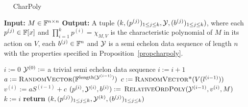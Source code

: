 \begin{algorithm}
\caption{$\quad$ \sc CharPoly}
\label{algcharpoly}
%
\begin{algorithmic}
\STATE \textbf{Input:} $M \in \mathbb{F}^{n\times n}$
\STATE \textbf{Output:} 
A tuple $(k, (p^{(j)})_{1\leq j\leq k}, \mathcal{Y}, (b^{(j)})_{1\leq j\leq
k})$, where  each $p^{(j)}\in\mathbb{F}[x]$ and $\prod_{i=1}^k p^{(i)} =
\chi_{M,V}$ is the characteristic polynomial
of $M$ in its action on $V$,  each  $b^{(j)}\in\mathbb{F}^n$ and $\mathcal{Y}$ is a
semi echelon data sequence of length $n$ with the properties
specified in Proposition~\ref{propcharpoly}.

\vspace*{2mm}
\STATE $i := 0$
\STATE $\mathcal{Y}^{(0)}:=$ a trivial semi echelon data sequence
    \STATE $i := i + 1$
    \STATE $a := \mbox{\sc RandomVector}(\mathbb{F}^{\mathrm{length}(\mathcal{Y}^{(i-1)})})$
    \STATE $c := \mbox{\sc RandomVector*}(V(l^{(i-1)}))$
    \STATE $v^{(i)} := aS^{(i-1)} + c$
	\STATE 
       \hspace*{10mm} 
    \STATE $(p^{(i)},\mathcal{Y}^{(i)},b^{(i)}) :=$
             $\mbox{\sc RelativeOrdPoly}(\mathcal{Y}^{(i-1)},v^{(i)},M)$
\STATE  \hspace*{10mm} 
\ENDWHILE
\STATE $k := i$
\STATE \textbf{return} $(k,(p^{(j)})_{1 \le j \le k}, 
                       \mathcal{Y}^{(k)}, 
(b^{(j)})_{1 \le j \le k})$
\end{algorithmic}
\end{algorithm}

